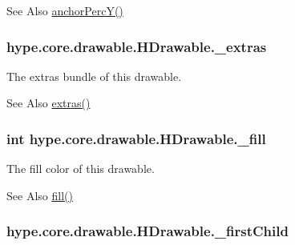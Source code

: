 \begin{DoxySeeAlso}{See Also}
\hyperlink{classhype_1_1core_1_1drawable_1_1_h_drawable_aa533e99dd9d51a2c7c0dfbe9aa333fda}{anchor\-Perc\-Y()} 
\end{DoxySeeAlso}
\hypertarget{classhype_1_1core_1_1drawable_1_1_h_drawable_a1a8ae31b67c5adc319cd8108b16171fe}{
\subsubsection[{\-\_\-extras}]{ hype.\-core.\-drawable.\-H\-Drawable.\-\_\-extras\hspace{0.3cm}{\ttfamily [protected]}}}\label{classhype_1_1core_1_1drawable_1_1_h_drawable_a1a8ae31b67c5adc319cd8108b16171fe}


The extras bundle of this drawable. 

\begin{DoxySeeAlso}{See Also}
\hyperlink{classhype_1_1core_1_1drawable_1_1_h_drawable_a3111c7ead30122880433c3244be5680a}{extras()} 
\end{DoxySeeAlso}
\hypertarget{classhype_1_1core_1_1drawable_1_1_h_drawable_a5f07bd6382bd895ca51c51a2285a31dc}{
\subsubsection[{\-\_\-fill}]{\setlength{\rightskip}{0pt plus 5cm}int hype.\-core.\-drawable.\-H\-Drawable.\-\_\-fill\hspace{0.3cm}{\ttfamily [protected]}}}\label{classhype_1_1core_1_1drawable_1_1_h_drawable_a5f07bd6382bd895ca51c51a2285a31dc}


The fill color of this drawable. 

\begin{DoxySeeAlso}{See Also}
\hyperlink{classhype_1_1core_1_1drawable_1_1_h_drawable_a3ea1f5a07f50a01c5210a059056758a7}{fill()} 
\end{DoxySeeAlso}
\hypertarget{classhype_1_1core_1_1drawable_1_1_h_drawable_ae09b30df6ce561c6e7d5dd4ca43ebd41}{
\subsubsection[{\-\_\-first\-Child}]{ hype.\-core.\-drawable.\-H\-Drawable.\-\_\-first\-Child\hspace{0.3cm}{\ttfamily [protected]}}}\label{classhype_1_1core_1_1drawable_1_1_h_drawable_ae09b30df6ce561c6e7d5dd4ca43ebd41}


